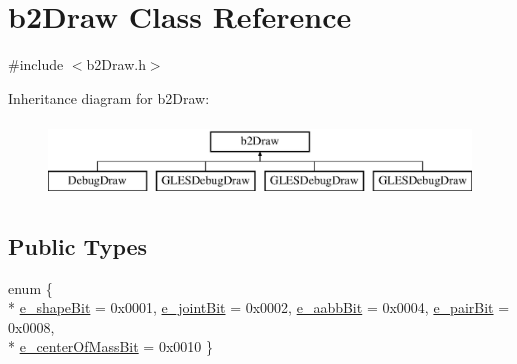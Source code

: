 \hypertarget{classb2_draw}{\section{b2\-Draw Class Reference}
\label{classb2_draw}
}


{\ttfamily \#include $<$b2\-Draw.\-h$>$}

Inheritance diagram for b2\-Draw\-:\begin{figure}[H]
\begin{center}
\leavevmode
\includegraphics[height=2.000000cm]{classb2_draw}
\end{center}
\end{figure}
\subsection*{Public Types}
\begin{DoxyCompactItemize}
\item 
enum \{ \\*
\hyperlink{classb2_draw_aa254f48fea4b3b559ed01da46579cd75a1c8964c4f1fdc39e98b58ac38ecda1f9}{e\-\_\-shape\-Bit} =  0x0001, 
\hyperlink{classb2_draw_aa254f48fea4b3b559ed01da46579cd75a241137a63679720c41a271c11681e2b3}{e\-\_\-joint\-Bit} =  0x0002, 
\hyperlink{classb2_draw_aa254f48fea4b3b559ed01da46579cd75acdf1370108930182a45f39e7cc9b0cc7}{e\-\_\-aabb\-Bit} =  0x0004, 
\hyperlink{classb2_draw_aa254f48fea4b3b559ed01da46579cd75ac86bb64ac65e555db28827407f2f2d43}{e\-\_\-pair\-Bit} =  0x0008, 
\\*
\hyperlink{classb2_draw_aa254f48fea4b3b559ed01da46579cd75a7f1494d816479c7d23997a6c292cd8b6}{e\-\_\-center\-Of\-Mass\-Bit} =  0x0010
 \}
\end{DoxyCompactItemize}
